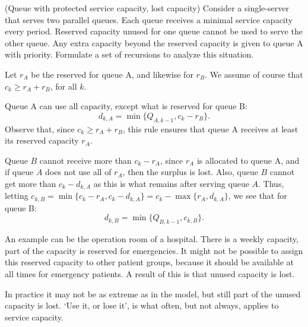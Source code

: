 \begin{question} 
  (Queue with protected service capacity, lost capacity) Consider a
  single-server that serves two parallel queues. Each queue receives a
  minimal service capacity every period. Reserved capacity unused for
  one queue cannot be used to serve the other queue. Any extra
  capacity beyond the reserved capacity is given to queue A with
  priority. Formulate a set of recursions to analyze this situation.
  \begin{solution}
    Let $r_A$ be the reserved for queue A, and likewise for $r_B$. We
    assume of course that $c_k\geq r_A + r_B$, for all $k$. 

Queue A can use all capacity, except what is reserved for queue B: 
\begin{equation*}
  d_{k,A} = \min\{Q_{A, k-1}, c_k - r_B\}.
\end{equation*}
Observe that, since $c_k \geq r_A + r_B$, this rule ensures that queue
A receives at least its reserved capacity $r_A$.

Queue $B$ cannot receive more than $c_k-r_A$, since $r_A$ is allocated
to queue A, and if queue $A$ does not use all of $r_A$, then the
surplus is lost. Also, queue $B$ cannot get more than $c_k - d_{k,A}$
as this is what remains after serving queue $A$. Thus, letting
$c_{k,B} = \min\{c_k-r_A, c_k-d_{k,A}\} = c_k - \max\{r_A, d_{k,A}\}$,
we see that for queue B:
\begin{equation*}
  d_{k,B} = \min\{Q_{B, k-1}, c_{k,B}\}.
\end{equation*}

An example can be the operation room of a hospital. There is a weekly
capacity, part of the capacity is reserved for emergencies. It might
not be possible to assign this reserved capacity to other patient
groups, because it should be available at all times for emergency
patients. A result of this is that unused capacity is lost.  

In practice it may not be as extreme as in the model, but still part
of the unused capacity is lost. `Use it, or lose it', is what often,
but not always, applies to service capacity.
  \end{solution}
\end{question}




